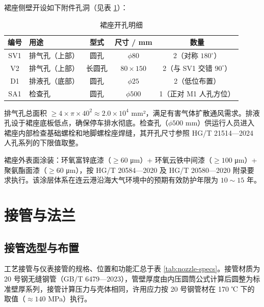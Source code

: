 裙座侧壁开设如下附件孔洞（见表 \ref{tab:skirt-openings}）：

\begin{table}[!htb]
  \centering
  \caption{裙座开孔明细}
  \label{tab:skirt-openings}
  \small\renewcommand{\arraystretch}{1.2}
  \setlength{\tabcolsep}{8pt}
  \begin{tabularx}{\textwidth}{@{}c >{\centering\arraybackslash}X c c c@{}}
    \toprule
    \textbf{编号} & \textbf{用途} & \textbf{型式} & \textbf{尺寸 / mm} & \textbf{数量} \\
    \midrule
    SV1 & 排气孔（上部） & 圆孔            & $\phi 80$        & 2（对称 $180^\circ$） \\
    V2  & 排气孔（上部） & 长圆孔          & $80 \times 150$  & 2（与 SV1 交错 $90^\circ$） \\
    D1  & 排液孔（底部） & 圆孔            & $\phi 25$        & 2（低位布置） \\
    SA1 & 检查孔         & 圆孔            & $\phi 500$       & 1（正对 M1 人孔方位） \\
    \bottomrule
  \end{tabularx}
\end{table}

排气孔总面积 $\ge 4 \times \pi \times 40^2 \approx 2.0 \times 10^4$ mm²，满足有害气体扩散通风需求。排液孔设于裙座底板低点，确保停车排水彻底。检查孔（$\phi 500$ mm）供运行人员进入裙座内部检查基础螺栓和地脚螺栓座焊缝，其开孔尺寸参照 HG/T 21514—2024 人孔系列的下限值取整。


裙座外表面涂装：环氧富锌底漆（$\ge 60$ μm）+ 环氧云铁中间漆（$\ge 100$ μm）+ 聚氨酯面漆（$\ge 60$ μm），按 HG/T 20584—2020\cite{hgt20584-2020} 及 HG/T 20580—2020\cite{hgt20580-2020} 附录要求执行。该涂层体系在连云港沿海大气环境中的预期有效防护年限为 $10\sim15$ 年。

\section{接管与法兰}

\subsection{接管选型与布置}

工艺接管与仪表接管的规格、位置和功能汇总于表 \ref{tab:nozzle-specs}。接管材质为 20 号钢无缝钢管（GB/T 6479—2023）\cite{gbt6479-2023}，管壁厚度由内压圆筒公式计算后圆整为标准壁厚系列，接管计算压力与壳体相同，许用应力按 20 号钢管材在 170 ℃ 下的取值（$\approx 140$ MPa）执行。


